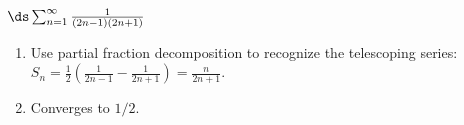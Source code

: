 {$\ds \sum_{n=1}^\infty \frac{1}{(2n-1)(2n+1)}$
}
{\begin{enumerate}
\item	Use partial fraction decomposition to recognize the telescoping series: $S_n = \frac12\left(\frac{1}{2n-1}-\frac{1}{2n+1}\right) = \frac{n}{2n+1}$.
\item	Converges to $1/2$.
\end{enumerate}
}
